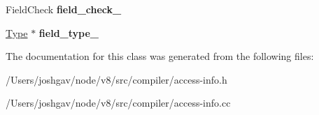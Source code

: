 \begin{DoxyCompactItemize}
\item 
Field\+Check {\bfseries field\+\_\+check\+\_\+}\hypertarget{classv8_1_1internal_1_1compiler_1_1_property_access_info_a6e2675dacee0fd89c7073bd0c3f3e499}{}\label{classv8_1_1internal_1_1compiler_1_1_property_access_info_a6e2675dacee0fd89c7073bd0c3f3e499}

\item 
\hyperlink{classv8_1_1internal_1_1_type}{Type} $\ast$ {\bfseries field\+\_\+type\+\_\+}\hypertarget{classv8_1_1internal_1_1compiler_1_1_property_access_info_a44d9e42f7e6efab87bdeaf00a50df0e2}{}\label{classv8_1_1internal_1_1compiler_1_1_property_access_info_a44d9e42f7e6efab87bdeaf00a50df0e2}

\end{DoxyCompactItemize}


The documentation for this class was generated from the following files\+:\begin{DoxyCompactItemize}
\item 
/\+Users/joshgav/node/v8/src/compiler/access-\/info.\+h\item 
/\+Users/joshgav/node/v8/src/compiler/access-\/info.\+cc\end{DoxyCompactItemize}
